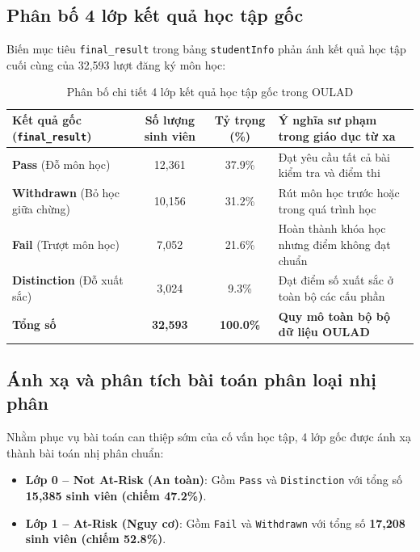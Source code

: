 \documentclass[11pt,a4paper]{article}
\begin{document}
\subsection{Phân bố 4 lớp kết quả học tập gốc}

Biến mục tiêu \texttt{final\_result} trong bảng \texttt{studentInfo} phản ánh kết quả học tập cuối cùng của 32,593 lượt đăng ký môn học:

\begin{table}[H]
\centering
\small
\renewcommand{\arraystretch}{1.25}
\begin{tabularx}{\textwidth}{@{}l c c X@{}}
\toprule
\textbf{Kết quả gốc (\texttt{final\_result})} & \textbf{Số lượng sinh viên} & \textbf{Tỷ trọng (\%)} & \textbf{Ý nghĩa sư phạm trong giáo dục từ xa} \\
\midrule
\textbf{Pass} (Đỗ môn học) & 12,361 & 37.9\% & Đạt yêu cầu tất cả bài kiểm tra và điểm thi \\
\textbf{Withdrawn} (Bỏ học giữa chừng) & 10,156 & 31.2\% & Rút môn học trước hoặc trong quá trình học \\
\textbf{Fail} (Trượt môn học) & 7,052 & 21.6\% & Hoàn thành khóa học nhưng điểm không đạt chuẩn \\
\textbf{Distinction} (Đỗ xuất sắc) & 3,024 & 9.3\% & Đạt điểm số xuất sắc ở toàn bộ các cấu phần \\
\midrule
\textbf{Tổng số} & \textbf{32,593} & \textbf{100.0\%} & \textbf{Quy mô toàn bộ bộ dữ liệu OULAD} \\
\bottomrule
\end{tabularx}
\caption{Phân bố chi tiết 4 lớp kết quả học tập gốc trong OULAD}
\end{table}

\subsection{Ánh xạ và phân tích bài toán phân loại nhị phân}

Nhằm phục vụ bài toán can thiệp sớm của cố vấn học tập, 4 lớp gốc được ánh xạ thành bài toán nhị phân chuẩn:
\begin{itemize}
    \item \textbf{Lớp 0 -- Not At-Risk (An toàn)}: Gồm \texttt{Pass} và \texttt{Distinction} với tổng số \textbf{15,385 sinh viên (chiếm 47.2\%)}.
    \item \textbf{Lớp 1 -- At-Risk (Nguy cơ)}: Gồm \texttt{Fail} và \texttt{Withdrawn} với tổng số \textbf{17,208 sinh viên (chiếm 52.8\%)}.
\end{itemize}
\end{document}

